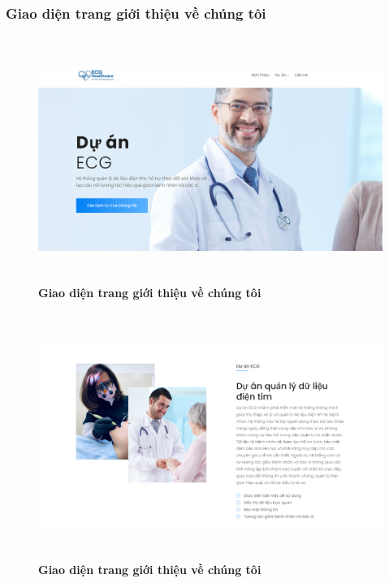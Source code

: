 \subsubsection{Giao diện trang giới thiệu về chúng tôi}
\begin{figure}[H]
	\centering
	\includegraphics[width=15cm,height=8cm]{Images/about_us/about_us_1.png}
	\caption[Giao diện trang giới thiệu về chúng tôi]{\bfseries \fontsize{12pt}{0pt}\selectfont Giao diện trang giới thiệu về chúng tôi}
	\label{}
\end{figure}
\begin{figure}[H]
	\centering
	\includegraphics[width=15cm,height=8cm]{Images/about_us/about_us_2.png}
	\caption[Giao diện trang giới thiệu về chúng tôi]{\bfseries \fontsize{12pt}{0pt}\selectfont Giao diện trang giới thiệu về chúng tôi}
	\label{}
\end{figure}
